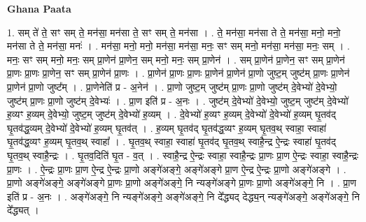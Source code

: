 \documentclass[17pt]{extarticle}
\begin{document}
\textbf{Ghana Paata } \newline

1. सम् ते॑ ते॒ सꣳ सम् ते॒ मन॑सा॒ मन॑सा ते॒ सꣳ सम् ते॒ मन॑सा । . ते॒ मन॑सा॒ मन॑सा ते ते॒ मन॑सा॒ मनो॒ मनो॒ मन॑सा ते ते॒ मन॑सा॒ मनः॑ । . मन॑सा॒ मनो॒ मनो॒ मन॑सा॒ मन॑सा॒ मनः॒ सꣳ सम् मनो॒ मन॑सा॒ मन॑सा॒ मनः॒ सम् । . मनः॒ सꣳ सम् मनो॒ मनः॒ सम् प्रा॒णेन॑ प्रा॒णेन॒ सम् मनो॒ मनः॒ सम् प्रा॒णेन॑ । . सम् प्रा॒णेन॑ प्रा॒णेन॒ सꣳ सम् प्रा॒णेन॑ प्रा॒णः प्रा॒णः प्रा॒णेन॒ सꣳ सम् प्रा॒णेन॑ प्रा॒णः । . प्रा॒णेन॑ प्रा॒णः प्रा॒णः प्रा॒णेन॑ प्रा॒णेन॑ प्रा॒णो जुष्ट॒म् जुष्ट॑म् प्रा॒णः प्रा॒णेन॑ प्रा॒णेन॑ प्रा॒णो जुष्ट᳚म् । . प्रा॒णेनेति॑ प्र - अ॒नेन॑ । . प्रा॒णो जुष्ट॒म् जुष्ट॑म् प्रा॒णः प्रा॒णो जुष्ट॑म् दे॒वेभ्यो॑ दे॒वेभ्यो॒ जुष्ट॑म् प्रा॒णः प्रा॒णो जुष्ट॑म् दे॒वेभ्यः॑ । . प्रा॒ण इति॑ प्र - अ॒नः । . जुष्ट॑म् दे॒वेभ्यो॑ दे॒वेभ्यो॒ जुष्ट॒म् जुष्ट॑म् दे॒वेभ्यो॑ ह॒व्यꣳ ह॒व्यम् दे॒वेभ्यो॒ जुष्ट॒म् जुष्ट॑म् दे॒वेभ्यो॑ ह॒व्यम् । . दे॒वेभ्यो॑ ह॒व्यꣳ ह॒व्यम् दे॒वेभ्यो॑ दे॒वेभ्यो॑ ह॒व्यम् घृ॒तव॑द् घृ॒तव॑द्ध॒व्यम् दे॒वेभ्यो॑ दे॒वेभ्यो॑ ह॒व्यम् घृ॒तव॑त् । . ह॒व्यम् घृ॒तव॑द् घृ॒तव॑द्ध॒व्यꣳ ह॒व्यम् घृ॒तव॒थ् स्वाहा॒ स्वाहा॑ घृ॒तव॑द्ध॒व्यꣳ ह॒व्यम् घृ॒तव॒थ् स्वाहा᳚ । . घृ॒तव॒थ् स्वाहा॒ स्वाहा॑ घृ॒तव॑द् घृ॒तव॒थ् स्वाहै॒न्द्र ऐ॒न्द्रः स्वाहा॑ घृ॒तव॑द् घृ॒तव॒थ् स्वाहै॒न्द्रः । . घृ॒तव॒दिति॑ घृ॒त - व॒त् । . स्वाहै॒न्द्र ऐ॒न्द्रः स्वाहा॒ स्वाहै॒न्द्रः प्रा॒णः प्रा॒ण ऐ॒न्द्रः स्वाहा॒ स्वाहै॒न्द्रः प्रा॒णः । . ऐ॒न्द्रः प्रा॒णः प्रा॒ण ऐ॒न्द्र ऐ॒न्द्रः प्रा॒णो अङ्गे॑अङ्गे॒ अङ्गे॑अङ्गे प्रा॒ण ऐ॒न्द्र ऐ॒न्द्रः प्रा॒णो अङ्गे॑अङ्गे । . प्रा॒णो अङ्गे॑अङ्गे॒ अङ्गे॑अङ्गे प्रा॒णः प्रा॒णो अङ्गे॑अङ्गे॒ नि न्यङ्गे॑अङ्गे प्रा॒णः प्रा॒णो अङ्गे॑अङ्गे॒ नि । . प्रा॒ण इति॑ प्र - अ॒नः । . अङ्गे॑अङ्गे॒ नि न्यङ्गे॑अङ्गे॒ अङ्गे॑अङ्गे॒ नि दे᳚द्ध्यद् देद्ध्य॒न् न्यङ्गे॑अङ्गे॒ अङ्गे॑अङ्गे॒ नि दे᳚द्ध्यत् । \newline
\end{document}
